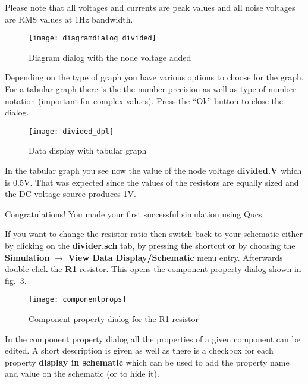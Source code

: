 Please note that all voltages and currents are peak values and all
noise voltages are RMS values at 1Hz bandwidth.

\begin{figure}[ht]
  \centering
  \texttt{[image: diagramdialog\_divided]}
  \caption{Diagram dialog with the node voltage added}
  \label{fig:diagramdialog_divided}
\end{figure}
\FloatBarrier

Depending on the type of graph you have various options to choose for
the graph.  For a tabular graph there is the the number precision as
well as type of number notation (important for complex values).  Press
the ``Ok'' button to close the dialog.

\begin{figure}[ht]
  \centering
  \texttt{[image: divided\_dpl]}
  \caption{Data display with tabular graph}
  \label{fig:divided_dpl}
\end{figure}
\FloatBarrier

In the tabular graph you see now the value of the node voltage
\textbf{divided.V} which is 0.5V.  That was expected since the values
of the resistors are equally sized and the DC voltage source produces
1V.

\medskip

Congratulations! You made your first successful simulation using Qucs.


If you want to change the resistor ratio then switch back to your
schematic either by clicking on the \textbf{divider.sch} tab, by
pressing the  shortcut or by choosing the
\textbf{Simulation} $\rightarrow$ \textbf{View Data Display/Schematic}
menu entry.  Afterwards double click the \textbf{R1} resistor.  This
opens the component property dialog shown in
fig.~\ref{fig:componentprops}.

\begin{figure}[ht]
  \centering
  \texttt{[image: componentprops]}
  \caption{Component property dialog for the R1 resistor}
  \label{fig:componentprops}
\end{figure}
\FloatBarrier

In the component property dialog all the properties of a given
component can be edited.  A short description is given as well as
there is a checkbox for each property \textbf{display in schematic}
which can be used to add the property name and value on the schematic
(or to hide it).


